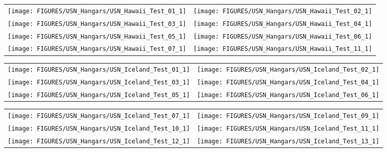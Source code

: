 \begin{figure}[p]
\begin{tabular*}{\textwidth}{l@{\extracolsep{\fill}}r}
\texttt{[image: FIGURES/USN\_Hangars/USN\_Hawaii\_Test\_01\_1]} &
\texttt{[image: FIGURES/USN\_Hangars/USN\_Hawaii\_Test\_02\_1]} \\
\texttt{[image: FIGURES/USN\_Hangars/USN\_Hawaii\_Test\_03\_1]} &
\texttt{[image: FIGURES/USN\_Hangars/USN\_Hawaii\_Test\_04\_1]} \\
\texttt{[image: FIGURES/USN\_Hangars/USN\_Hawaii\_Test\_05\_1]} &
\texttt{[image: FIGURES/USN\_Hangars/USN\_Hawaii\_Test\_06\_1]} \\
\texttt{[image: FIGURES/USN\_Hangars/USN\_Hawaii\_Test\_07\_1]} &
\texttt{[image: FIGURES/USN\_Hangars/USN\_Hawaii\_Test\_11\_1]}
\end{tabular*}
\label{USN_Plume_Hawaii}
\end{figure}

\begin{figure}[p]
\begin{tabular*}{\textwidth}{l@{\extracolsep{\fill}}r}
\texttt{[image: FIGURES/USN\_Hangars/USN\_Iceland\_Test\_01\_1]} &
\texttt{[image: FIGURES/USN\_Hangars/USN\_Iceland\_Test\_02\_1]} \\
\texttt{[image: FIGURES/USN\_Hangars/USN\_Iceland\_Test\_03\_1]} &
\texttt{[image: FIGURES/USN\_Hangars/USN\_Iceland\_Test\_04\_1]} \\
\texttt{[image: FIGURES/USN\_Hangars/USN\_Iceland\_Test\_05\_1]} &
\texttt{[image: FIGURES/USN\_Hangars/USN\_Iceland\_Test\_06\_1]} \\
\end{tabular*}
\label{USN_Plume_Iceland_1}
\end{figure}

\begin{figure}[p]
\begin{tabular*}{\textwidth}{l@{\extracolsep{\fill}}r}
\texttt{[image: FIGURES/USN\_Hangars/USN\_Iceland\_Test\_07\_1]} &
\texttt{[image: FIGURES/USN\_Hangars/USN\_Iceland\_Test\_09\_1]} \\
\texttt{[image: FIGURES/USN\_Hangars/USN\_Iceland\_Test\_10\_1]} &
\texttt{[image: FIGURES/USN\_Hangars/USN\_Iceland\_Test\_11\_1]} \\
\texttt{[image: FIGURES/USN\_Hangars/USN\_Iceland\_Test\_12\_1]} &
\texttt{[image: FIGURES/USN\_Hangars/USN\_Iceland\_Test\_13\_1]} \\
\end{tabular*}
\label{USN_Plume_Iceland_2}
\end{figure}

